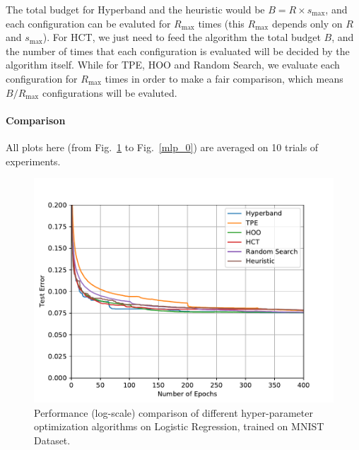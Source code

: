 \documentclass[runningheads,a4paper]{llncs}
\begin{document}
The total budget for Hyperband and the heuristic would be $B = R\times s_{\max}$, and each configuration can be evaluted for $R_{\max}$ times (this $R_{\max}$ depends only on $R$ and $s_{\max}$). For HCT, we just need to feed the algorithm the total budget $B$, and the number of times that each configuration is evaluated will be decided by the algorithm itself. While for TPE, HOO and Random Search, we  evaluate each configuration for $R_{\max}$ times in order to make a fair comparison, which means $B/R_{\max}$ configurations will be evaluted.

\paragraph{\textbf{Comparison}}
All plots here (from Fig.~\ref{logistic_1} to Fig.~\ref{mlp_0}) are averaged on 10 trials of experiments.

\begin{figure}[ht]
    \centering
    \includegraphics[scale=0.8]{img/mnist/logistic_1.pdf}
    \caption{Performance (log-scale) comparison of different hyper-parameter optimization algorithms on Logistic Regression, trained on MNIST Dataset.}
    \label{logistic_1}
\end{figure}
\end{document}
